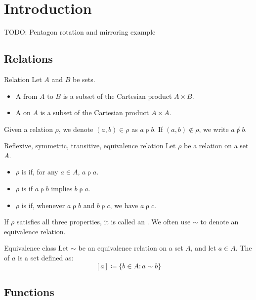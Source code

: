 \chapter{Introduction}

TODO: Pentagon rotation and mirroring example

\section{Relations}

\begin{dfnbox}{Relation}{}
    Let $A$ and $B$ be sets.
    \begin{itemize}
        \item A  from $A$ to $B$ is a subset of the Cartesian product $A \times B$.
        \item A  on $A$ is a subset of the Cartesian product $A \times A$.
    \end{itemize}
    Given a relation $\rho$, we denote $(a,b) \in \rho$ as $a \mathrel{\rho} b$. If $(a,b) \notin \rho$, we write $a \mathrel{\not\rho} b$.
\end{dfnbox}

\begin{dfnbox}{Reflexive, symmetric, transitive, equivalence relation}{}
    Let $\rho$ be a relation on a set $A$.
    \begin{itemize}
        \item $\rho$ is  if, for any $a \in A$, $a \mathrel{\rho} a$.
        \item $\rho$ is  if $a \mathrel{\rho} b$ implies $b \mathrel{\rho} a$.
        \item $\rho$ is  if, whenever $a \mathrel{\rho} b$ and $b \mathrel{\rho} c$, we have $a \mathrel{\rho} c$.
    \end{itemize}
    If $\rho$ satisfies all three properties, it is called an . We often use $\sim$ to denote an equivalence relation.
\end{dfnbox}

\begin{dfnbox}{Equivalence class}{}
    Let $\sim$ be an equivalence relation on a set $A$, and let $a \in A$. The  of $a$ is a set defined as:
    \[ [a] \coloneq \{b \in A : a \sim b \} \]
\end{dfnbox}

\section{Functions}

